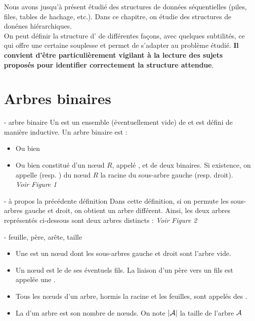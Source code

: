 

Nous avons jusqu'à présent étudié des structures de données séquentielles (piles, files, tables de hachage, etc.). Dans ce chapitre, on étudie des structures de donénes hiérarchiques. \\
On peut définir la structure d' de différentes façons, avec quelques subtilités, ce qui offre une certaine souplesse et permet de s'adapter au problème étudié. \textbf{Il convient d'être particulièrement vigilant à la lecture des sujets proposés pour identifier correctement la structure attendue}.
\section{Arbres binaires}

\begin{definition}{7.1}{ - arbre binaire}
    Un  est un ensemble (éventuellement vide) de  et est défini de manière inductive. Un arbre binaire est : \begin{itemize}
        \item Ou bien 
        \item Ou bien constitué d'un nœud $R$, appelé , et de deux  binaires. Si existence, on appelle  (resp. ) du nœud $R$ la racine du sous-arbre gauche (resp. droit). \\ \textit{Voir Figure 1}
    \end{itemize}
\end{definition}

\begin{remarque}{7.2}{ - à propos la précédente définition}
    Dans cette définition, si on permute les sous-arbres gauche et droit, on obtient un arbre différent. Ainsi, les deux arbres représentés ci-dessous sont deux arbres distincts : \textit{Voir Figure 2}
\end{remarque}

\begin{definition}{7.3}{ - feuille, père, arête, taille}
    \begin{itemize}
        \item Une  est un nœud dont les sous-arbres gauche et droit sont l'arbre vide.
        \item Un nœud est le  de ses éventuels fils. La liaison d'un père vers un fils est appelée une .
        \item Tous les nœuds d'un arbre, hormis la racine et les feuilles, sont appelés des .
        \item La  d'un arbre est son nombre de nœuds. On note $|\mathcal{A}|$ la taille de l'arbre $\mathcal{A}$
    \end{itemize}
\end{definition}

